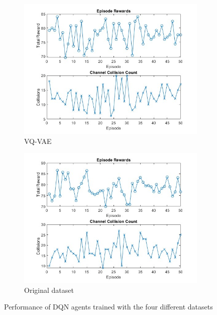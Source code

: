 \begin{figure}[htbp]
    \begin{subfigure}[b]{0.45\textwidth}
        \centering
        \includegraphics[width=\linewidth]{figures/collision_count_vqvae.jpg}
        \caption{VQ-VAE}
    \end{subfigure}
    \hfill
    \begin{subfigure}[b]{0.45\textwidth}
        \centering
        \includegraphics[width=\linewidth]{figures/collision_count_original.jpg}
        \caption{Original dataset}
    \end{subfigure}

    \caption{Performance of DQN agents trained with the four different datasets}
\end{figure}

